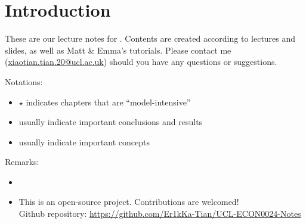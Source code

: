 \chapter*{Introduction}
These are our  lecture notes for . Contents are created according to lectures and slides, as well as Matt \& Emma's tutorials. Please contact me (\url{xiaotian.tian.20@ucl.ac.uk}) should you have any questions or suggestions.

Notations:
\begin{itemize}
    \item $\star$ indicates chapters that are ``model-intensive''
    \item {} usually indicate important conclusions and results
    \item {} usually indicate important concepts
\end{itemize}

Remarks:
\begin{itemize}
    \item {}
    \item This is an open-source project. Contributions are welcomed!\\Github repository: \url{https://github.com/Er1kKa-Tian/UCL-ECON0024-Notes}
\end{itemize}



\iffalse
    \begin{figure}[H]
        \centering
        \texttt{[image: images/102115356\_p0.jpg]}
        \caption{Enjoy this lovely picture before we start!}
        \label{fig:Introduction}
    \end{figure}
\fi